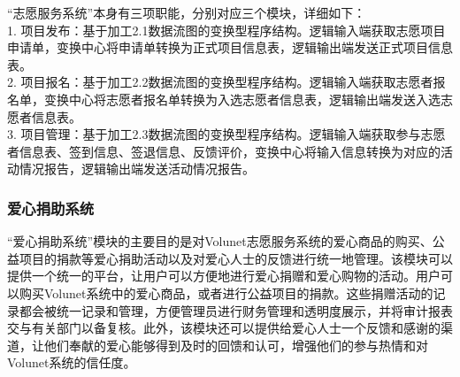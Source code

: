 “志愿服务系统”本身有三项职能，分别对应三个模块，详细如下：\\
1. 项目发布：基于加工2.1数据流图的变换型程序结构。逻辑输入端获取志愿项目申请单，变换中心将申请单转换为正式项目信息表，逻辑输出端发送正式项目信息表。\\
2. 项目报名：基于加工2.2数据流图的变换型程序结构。逻辑输入端获取志愿者报名单，变换中心将志愿者报名单转换为入选志愿者信息表，逻辑输出端发送入选志愿者信息表。\\
3. 项目管理：基于加工2.3数据流图的变换型程序结构。逻辑输入端获取参与志愿者信息表、签到信息、签退信息、反馈评价，变换中心将输入信息转换为对应的活动情况报告，逻辑输出端发送活动情况报告。\\

\begin{landscape}
    \begin{figure}[bp]
    \end{figure}

\end{landscape}



\subsubsection{爱心捐助系统}



“爱心捐助系统”模块的主要目的是对Volunet志愿服务系统的爱心商品的购买、公益项目的捐款等爱心捐助活动以及对爱心人士的反馈进行统一地管理。该模块可以提供一个统一的平台，让用户可以方便地进行爱心捐赠和爱心购物的活动。用户可以购买Volunet系统中的爱心商品，或者进行公益项目的捐款。这些捐赠活动的记录都会被统一记录和管理，方便管理员进行财务管理和透明度展示，并将审计报表交与有关部门以备复核。此外，该模块还可以提供给爱心人士一个反馈和感谢的渠道，让他们奉献的爱心能够得到及时的回馈和认可，增强他们的参与热情和对Volunet系统的信任度。

